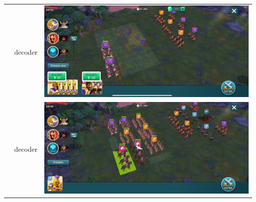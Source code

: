 \begin{longtable}{|c|c|c|}
	& decoder &
	\includegraphics[width=0.75\linewidth]{./parts/media/TreasureHunt/40/decoder/photo_2022-04-07_13-16-12.jpg} \\
	& decoder &
	\includegraphics[width=0.75\linewidth]{./parts/media/TreasureHunt/40/decoder/photo_2022-04-07_13-15-51.jpg} \\
	\hline
\end{longtable}
